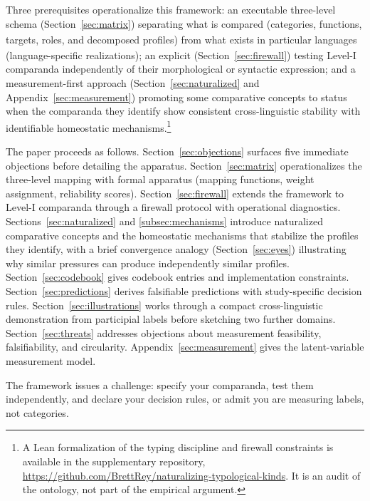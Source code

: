 \documentclass[12pt]{article}
\begin{document}
Three prerequisites operationalize this framework: an executable three-level  schema (Section~\ref{sec:matrix}) separating what is compared (categories\textsubscript{\Cross}, functions\textsubscript{\Cross}, targets\textsubscript{\Cross}, roles\textsubscript{\Cross}, and decomposed profiles) from what exists in particular languages (language-specific realizations); an explicit  (Section~\ref{sec:firewall}) testing Level-I comparanda independently of their morphological or syntactic expression; and a measurement-first approach (Section~\ref{sec:naturalized} and Appendix~\ref{sec:measurement}) promoting some comparative concepts to  status when the comparanda they identify show consistent cross-linguistic stability with identifiable homeostatic mechanisms.\footnote{A Lean formalization of the typing discipline and firewall constraints is available in the supplementary repository, \url{https://github.com/BrettRey/naturalizing-typological-kinds}. It is an audit of the ontology, not part of the empirical argument.}

The paper proceeds as follows. Section~\ref{sec:objections} surfaces five immediate objections before detailing the apparatus. Section~\ref{sec:matrix} operationalizes the three-level mapping with formal apparatus (mapping functions, weight assignment, reliability scores). Section~\ref{sec:firewall} extends the framework to Level-I comparanda through a firewall protocol with operational diagnostics. Sections~\ref{sec:naturalized} and \ref{subsec:mechanisms} introduce naturalized comparative concepts and the homeostatic mechanisms that stabilize the profiles they identify, with a brief convergence analogy (Section~\ref{sec:eyes}) illustrating why similar pressures can produce independently similar profiles. Section~\ref{sec:codebook} gives codebook entries and implementation constraints. Section~\ref{sec:predictions} derives falsifiable predictions with study-specific decision rules. Section~\ref{sec:illustrations} works through a compact cross-linguistic demonstration from participial labels before sketching two further domains. Section~\ref{sec:threats} addresses objections about measurement feasibility, falsifiability, and circularity. Appendix~\ref{sec:measurement} gives the latent-variable measurement model.

The framework issues a challenge: specify your comparanda, test them independently, and declare your decision rules, or admit you are measuring labels, not categories.
\end{document}
